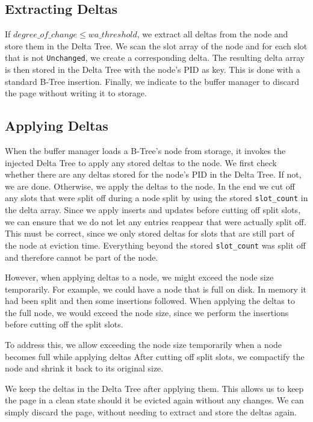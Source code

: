 \subsection*{Extracting Deltas}
If $degree\_of\_change \leq wa\_threshold$, we extract all deltas from the node and store them in the Delta Tree.
We scan the slot array of the node and for each slot that is not \texttt{Unchanged}, we create a corresponding delta.
The resulting delta array is then stored in the Delta Tree with the node's \ac{PID} as key.
This is done with a standard B-Tree insertion.
Finally, we indicate to the buffer manager to discard the page without writing it to storage.

\subsection*{Applying Deltas}
When the buffer manager loads a B-Tree's node from storage, it invokes the injected Delta Tree to apply any stored deltas to the node.
We first check whether there are any deltas stored for the node's \ac{PID} in the Delta Tree.
If not, we are done.
Otherwise, we apply the deltas to the node.
In the end we cut off any slots that were split off during a node split by using the stored \texttt{slot\_count} in the delta array.
Since we apply inserts and updates before cutting off split slots, we can ensure that we do not let any entries reappear that were actually split off. 
This must be correct, since we only stored deltas for slots that are still part of the node at eviction time.
Everything beyond the stored \texttt{slot\_count} was split off and therefore cannot be part of the node.

However, when applying deltas to a node, we might exceed the node size temporarily.
For example, we could have a node that is full on disk. 
In memory it had been split and then some insertions followed. 
When applying the deltas to the full node, we would exceed the node size, since we perform the insertions before cutting off the split slots.

To address this, we allow exceeding the node size temporarily when a node becomes full while applying deltas
After cutting off split slots, we compactify the node and shrink it back to its original size.

We keep the deltas in the Delta Tree after applying them.
This allows us to keep the page in a clean state should it be evicted again without any changes.
We can simply discard the page, without needing to extract and store the deltas again.

